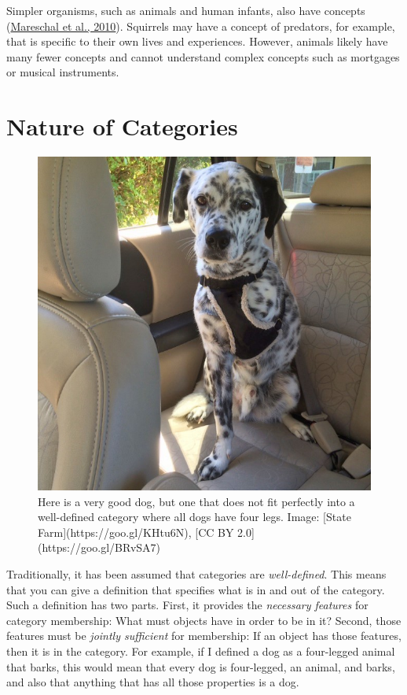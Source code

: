 \documentclass[
]{krantz}
\begin{document}
Simpler organisms, such as animals and human infants, also have concepts (\protect\hyperlink{ref-Mareschal2010}{Mareschal et al., 2010}). Squirrels may have a concept of predators, for example, that is specific to their own lives and experiences. However, animals likely have many fewer concepts and cannot understand complex concepts such as mortgages or musical instruments.

\hypertarget{nature-of-categories}{%
\section{Nature of Categories}\label{nature-of-categories}}

\begin{figure}

{\centering \includegraphics[width=0.5\linewidth]{images/ch7/dog} 

}

\caption{Here is a very good dog, but one that does not fit perfectly into a well-defined category where all dogs have four legs. Image: [State Farm](https://goo.gl/KHtu6N), [CC BY 2.0](https://goo.gl/BRvSA7)}\label{fig:dog}
\end{figure}

Traditionally, it has been assumed that categories are \emph{well-defined}. This means that you can give a definition that specifies what is in and out of the category. Such a definition has two parts. First, it provides the \emph{necessary features} for category membership: What must objects have in order to be in it? Second, those features must be \emph{jointly sufficient} for membership: If an object has those features, then it is in the category. For example, if I defined a dog as a four-legged animal that barks, this would mean that every dog is four-legged, an animal, and barks, and also that anything that has all those properties is a dog.
\end{document}
